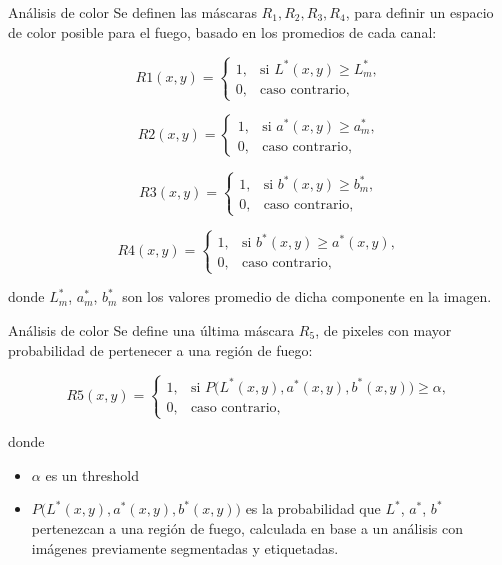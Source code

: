 \documentclass{beamer}
\begin{document}
\begin{frame}{Análisis de color}
Se definen las máscaras $R_1, R_2, R_3, R_4$, para definir un espacio de color posible para el fuego, basado en los promedios de cada canal:


\[
R1(x,y) = 
\begin{cases}
    1, & \text{si } L^*(x,y) \geq L^*_m, \\
    0, & \text{caso contrario,}
\end{cases}
\]

\[
R2(x,y) = 
\begin{cases}
    1, & \text{si } a^*(x,y) \geq a^*_m, \\
    0, & \text{caso contrario,}
\end{cases}
\]

\[
R3(x,y) = 
\begin{cases}
    1, & \text{si } b^*(x,y) \geq b^*_m, \\
    0, & \text{caso contrario,}
\end{cases}
\]

\[
R4(x,y) = 
\begin{cases}
    1, & \text{si } b^*(x,y) \geq a^*(x,y), \\
    0, & \text{caso contrario,}
\end{cases}
\]

donde $L^*_m$, $a^*_m$, $b^*_m$ son los valores promedio de dicha componente en la imagen.
\end{frame}

\begin{frame}{Análisis de color}
Se define una última máscara $R_5$, de pixeles con mayor probabilidad de pertenecer a una región de fuego: 

\[
R5(x,y) = 
\begin{cases}
    1, & \text{si } P\big(L^*(x,y), a^*(x,y), b^*(x,y)\big) \geq \alpha, \\
    0, & \text{caso contrario,}
\end{cases}
\]

donde 
 \begin{itemize}
     \item $\alpha$ es un threshold
     \item $P\big(L^*(x,y), a^*(x,y), b^*(x,y)\big)$ es la probabilidad que $L^*$, $a^*$, $b^*$ pertenezcan a una región de fuego, calculada en base a un análisis con imágenes previamente segmentadas y etiquetadas.
 \end{itemize}    
\end{frame}
\end{document}
